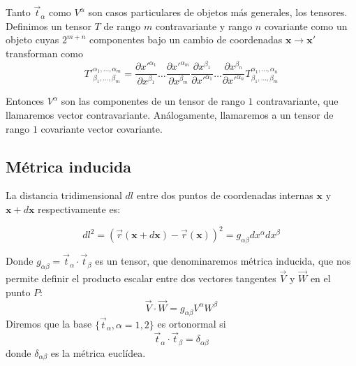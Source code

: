 Tanto $\vec{t}_{\alpha}$ como $V^{\alpha}$ son casos particulares de objetos
más generales, los tensores. Definimos un tensor $T$ de rango $m$
contravariante y rango $n$ covariante como un objeto cuyas $2^{m+n}$ componentes
bajo un cambio de coordenadas $\mathbf{x}\rightarrow\mathbf{x'}$ transforman
como 
\begin{equation*}
T'^{\alpha_1,\dots,\alpha_m}_{\beta_1,\dots,\beta_m}=
\frac{\partial x'^{\alpha_1}}{\partial x^{\beta_1}}\dots \frac{\partial
  x'^{\alpha_m}}{\partial x^{\beta_m}}
\frac{\partial x^{\beta_1}}{\partial x'^{\alpha_1}}\dots \frac{\partial
  x^{\beta_n}}{\partial x'^{\alpha_n}}T^{\alpha_1,\dots,\alpha_n}_{\beta_1,\dots,\beta_m}
\end{equation*}

Entonces $V^{\alpha}$ son las componentes de un tensor de rango $1$
contravariante, que llamaremos vector contravariante. Análogamente,
llamaremos a un tensor de rango $1$ covariante vector covariante.
 
\subsection{Métrica inducida}

La distancia tridimensional $dl$ entre dos puntos de coordenadas internas
$\mathbf{x}$ y $\mathbf{x}+d\mathbf{x}$ respectivamente es:

\begin{equation}\label{elemento_linea}
dl^2=(\vec{r}(\mathbf{x}+d\mathbf{x})-\vec{r}(\mathbf{x}))^2=g_{\alpha\beta}dx^{\alpha}dx^{\beta}
\end{equation}

Donde $g_{\alpha\beta}=\vec{t}_{\alpha}\cdot\vec{t}_{\beta}$ es un tensor, que
denominaremos métrica inducida, que nos permite definir el producto escalar
entre dos vectores tangentes $\vec{V}$ y $\vec{W}$ en el punto $P$:
\begin{equation}\label{producto_escalar}
\vec{V}\cdot\vec{W}=g_{\alpha\beta}V^{\alpha}W^{\beta}
\end{equation}
Diremos que la base $\{ \vec{t}_{\alpha}, \alpha=1,2\}$ es ortonormal si
\begin{equation*}
\vec{t}_{\alpha}\cdot\vec{t}_{\beta}=\delta_{\alpha\beta}
\end{equation*}
donde $\delta_{\alpha\beta}$ es la métrica euclídea. 



